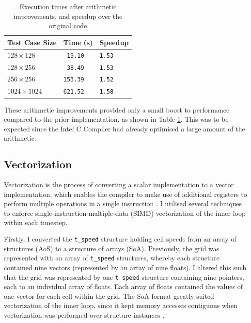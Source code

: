 \documentclass[11pt, twocolumn, a4paper]{article}
\begin{document}
\begin{table}[htbp]
  \begin{center}
  \caption{Execution times after arithmetic improvements, and speedup over the original code}\label{tab:arithmetic_improvements}
  \begin{tabular}{l | l l} 
      \hline\hline
      Test Case Size&Time (s)&Speedup\\
      \hline
      $128 \times 128$&\texttt{ 19.10}&\texttt{1.53}\\
      $128 \times 256$&\texttt{ 38.49}&\texttt{1.53}\\
      $256 \times 256$&\texttt{153.39}&\texttt{1.52}\\
      $1024 \times 1024$&\texttt{621.52}&\texttt{1.58}\\
      \hline
    \end{tabular}
  \end{center}
\end{table}

These arithmetic improvements provided only a small boost to performance compared to the prior implementation, as shown in Table \ref{tab:arithmetic_improvements}.
This was to be expected since the Intel C Compiler had already optimised a large amount of the arithmetic.

\subsection{Vectorization}

Vectorization is the process of converting a scalar implementation to a vector implementation, which enables the compiler to make use of additional registers to perform multiple operations in a single instruction \cite{vectorization}.
I utilised several techniques to enforce single-instruction-multiple-data (SIMD) vectorization of the inner loop within each timestep.

Firstly, I converted the \texttt{t\_speed} structure holding cell speeds from an array of structures (AoS) to a structure of arrays (SoA).
Previously, the grid was represented with an array of \texttt{t\_speed} structures, whereby each structure contained nine vectors (represented by an array of nine floats).
I altered this such that the grid was represented by one \texttt{t\_speed} structure containing nine pointers, each to an individual array of floats.
Each array of floats contained the values of one vector for each cell within the grid.
The SoA format greatly suited vectorization of the inner loop, since it kept memory accesses contiguous when vectorization was performed over structure instances \cite{soa}.
\end{document}
